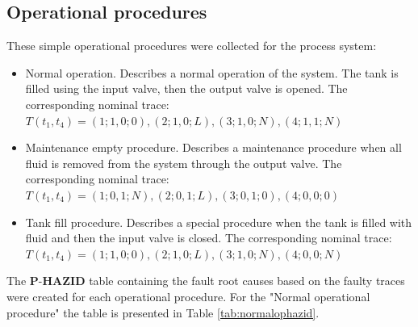 \documentclass[conference]{IEEEtran}
\begin{document}
\subsection{Operational procedures}

These simple operational procedures were collected for the process system:
\begin{itemize}
\item Normal operation. Describes a normal operation of the system. The tank is filled using the input valve, then the output valve is opened. The corresponding nominal trace:
$T(t_1,t_4)=(1;1,0;0),(2;1,0;L),(3;1,0;N),(4;1,1;N)$
\item Maintenance empty procedure. Describes a maintenance procedure when all fluid is removed from the system through the output valve. The corresponding nominal trace:
$T(t_1,t_4)=(1;0,1;N),(2;0,1;L),(3;0,1;0),(4;0,0;0)$
\item Tank fill procedure. Describes a special procedure when the tank is filled with fluid and then the input valve is closed. The corresponding nominal trace:
$T(t_1,t_4)=(1;1,0;0),(2;1,0;L),(3;1,0;N),(4;0,0;N)$
\end{itemize}

The $\textbf{P-HAZID}$ table containing the fault root causes based on the faulty traces were created for each operational procedure. For the "Normal operational procedure" the table is presented in Table \ref{tab:normalophazid}.
\end{document}
